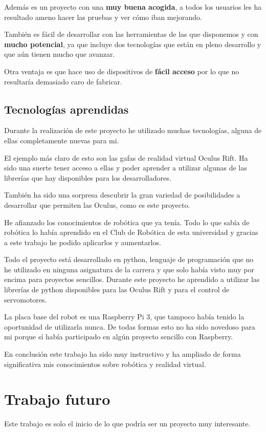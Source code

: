 \documentclass[twoside, 12pt]{epstfg}
\begin{document}
Además es un proyecto con una \textbf{muy buena acogida}, a todos los usuarios les ha resultado ameno hacer las pruebas y ver cómo iban mejorando.

También es fácil de desarrollar con las herramientas de las que disponemos y con \textbf{mucho potencial}, ya que incluye dos tecnologías que están en pleno desarrollo y que aún tienen mucho que avanzar.

Otra ventaja es que hace uso de dispositivos de \textbf{fácil acceso} por lo que no resultaría demasiado caro de fabricar.

\subsection{Tecnologías aprendidas}

Durante la realización de este proyecto he utilizado muchas tecnologías, alguna de ellas completamente nuevas para mi.

El ejemplo más claro de esto son las gafas de realidad virtual Oculus Rift. Ha sido una suerte tener acceso a ellas y poder aprender a utilizar algunas de las librerías que hay disponibles para los desarrolladores.

También ha sido una sorpresa descubrir la gran variedad de posibilidades a desarrollar que permiten las Oculus, como es este proyecto.

He afianzado los conocimientos de robótica que ya tenía. Todo lo que sabía de robótica lo había aprendido en el Club de Robótica de esta universidad y gracias a este trabajo he podido aplicarlos y aumentarlos.

Todo el proyecto está desarrollado en python, lenguaje de programación que no he utilizado en ninguna asignatura de la carrera y que solo había visto muy por encima para proyectos sencillos.
Durante este proyecto he aprendido a utilizar las librerías de python disponibles para las Oculus Rift y para el control de servomotores.

La placa base del robot es una Raspberry Pi 3, que tampoco había tenido la oportunidad de utilizarla nunca. De todas formas esto no ha sido novedoso para mi porque sí había participado en algún proyecto sencillo con Raspberry.

En conclusión este trabajo ha sido muy instructivo y ha ampliado de forma significativa mis conocimientos sobre robótica y realidad virtual.



\section{Trabajo futuro}
Este trabajo es solo el inicio de lo que podría ser un proyecto muy interesante.
\end{document}
